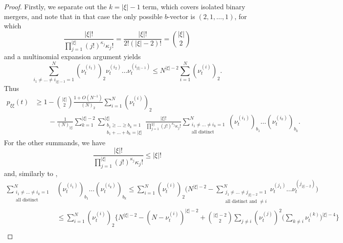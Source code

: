 \documentclass{article} %
\theoremstyle{definition}
\newcommand{\1}[1]{\mathbbm{1}_{\{#1\}}}
\begin{document}
\begin{proof}
Firstly, we separate out the $k = | \xi | - 1$ term, which covers isolated binary mergers, and note that in that case the only possible $b$-vector is $(2, 1, \ldots, 1)$, for which
\begin{equation*}
\frac{ | \xi |! }{ \prod_{ j = 1 }^{ | \xi | } ( j ! )^{ \kappa_j } \kappa_j ! } = \frac{ | \xi |! }{ 2 ! ( | \xi | - 2 ) ! } = \binom{ | \xi | }{ 2 }
\end{equation*}
and a multinomial expansion argument yields
\begin{equation*}
\sum_{ i_1 \neq \ldots \neq i_{ | \xi | - 1 } = 1 }^N ( \nu_t^{ ( i_1 ) } )_2 \nu_t^{ ( i_2 ) } \ldots \nu_t^{ ( i_{ | \xi | - 1 } ) }
\leq N^{ | \xi | - 2 } \sum_{ i = 1 }^N ( \nu_t^{ ( i ) } )_2 .
\end{equation*}
Thus
\begin{align*}
p_{ \xi \xi }( t ) &\geq 1 - \binom{ | \xi | }{ 2 } \frac{ 1 + O( N^{ -1 } ) }{ ( N )_2 } \sum_{ i = 1 }^N ( \nu_t^{ ( i ) } )_2 \\
&\qquad - \frac{ 1 }{ ( N )_{ | \xi | } } \sum_{ k = 1 }^{ | \xi | - 2 } \sum_{ \substack{ b_1 \geq \ldots \geq b_k = 1 \\ b_1 + \ldots + b_k = | \xi | } }^{ | \xi | } \frac{ | \xi |! }{ \prod_{ j = 1 }^{ | \xi | } ( j ! )^{ \kappa_j } \kappa_j ! } \sum_{ \substack{ i_1 \neq \ldots \neq i_k = 1 \\ \text{all distinct} } }^N( \nu_t^{ ( i_1 ) } )_{ b_1 } \ldots ( \nu_t^{ ( i_k ) } )_{ b_k }.
\end{align*}
For the other summands, we have
\begin{equation*}
\frac{ | \xi |! }{ \prod_{ j = 1 }^{ | \xi | } ( j ! )^{ \kappa_j } \kappa_j ! } \leq | \xi | !
\end{equation*}
and, similarly to \cite[Lemma 1, Case 3]{koskela2018},
\begin{align*}
\sum_{ \substack{ i_1 \neq \ldots \neq i_k = 1 \\ \text{all distinct} } }^N &( \nu_t^{ ( i_1 ) } )_{ b_1 } \ldots ( \nu_t^{ ( i_k ) } )_{ b_k } \leq \sum_{ i = 1 }^N ( \nu_t^{ ( i ) } )_2 \Bigg( N^{ | \xi | - 2 } - \sum_{ \substack{ j_1 \neq \ldots \neq j_{ | \xi | - 2 } = 1 \\ \text{all distinct and } \neq i } }^N \nu_t^{ ( j_1 ) } \ldots \nu_t^{ ( j_{ | \xi | - 2 } ) } \Bigg) \\
&\leq \sum_{ i = 1 }^N ( \nu_t^{ ( i ) } )_2 \Bigg\{ N^{ | \xi | - 2 } - ( N - \nu_t^{ ( i ) } )^{ | \xi | - 2 } + \binom{ | \xi | - 2 }{ 2 } \sum_{ j \neq i } ( \nu_t^{ ( j ) } )^2 \Bigg( \sum_{ k \neq i } \nu_t^{ ( k ) } \Bigg)^{ | \xi | - 4 } \Bigg\} \\

\end{align*}
\end{proof}
\end{document}
